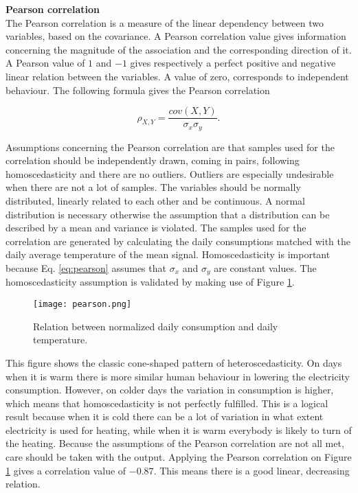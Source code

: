 \textbf{Pearson correlation}\\
The Pearson correlation is a measure of the linear dependency between two variables, based on the covariance. A Pearson correlation value gives information concerning the magnitude of the association and the corresponding direction of it. A Pearson value of $ 1 $ and $ -1 $ gives respectively a perfect positive and negative linear relation between the variables. A value of zero, corresponds to independent behaviour. The following formula gives the Pearson correlation

\begin{equation}\label{eq:pearson}
	\rho_{X,Y} = \frac{cov(X,Y)}{\sigma_x\sigma_y}.
\end{equation}

Assumptions concerning the Pearson correlation are that samples used for the correlation should be independently drawn, coming in pairs, following homoscedasticity and there are no outliers. Outliers are especially undesirable when there are not a lot of samples. The variables should be normally distributed, linearly related to each other and be continuous. A normal distribution is necessary otherwise the assumption that a distribution can be described by a mean and variance is violated. The samples used for the correlation are generated by calculating the daily consumptions matched with the daily average temperature of the mean signal. Homoscedasticity is important because Eq. \ref{eq:pearson} assumes that $ \sigma_x $ and $ \sigma_y $ are constant values. The homoscedasticity assumption is validated by making use of Figure \ref{fig:pearson}.

\begin{figure}[h]
	\centering
	\texttt{[image: pearson.png]}
	\caption{Relation between normalized daily consumption and daily temperature.}
	\label{fig:pearson}
\end{figure}

This figure shows the classic cone-shaped pattern of heteroscedasticity. On days when it is warm there is more similar human behaviour in lowering the electricity consumption. However, on colder days the variation in consumption is higher, which means that homoscedasticity is not perfectly fulfilled. This is a logical result because when it is cold there can be a lot of variation in what extent electricity is used for heating, while when it is warm everybody is likely to turn of the heating. Because the assumptions of the Pearson correlation are not all met, care should be taken with the output. Applying the Pearson correlation on Figure \ref{fig:pearson} gives a correlation value of $ -0.87 $. This means there is a good linear, decreasing relation.\\


